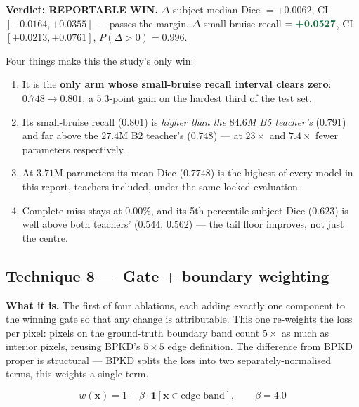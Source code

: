 \documentclass[11pt]{article}
\newcommand{\win}[1]{\textcolor{wingreen}{\textbf{#1}}}
\begin{document}
\textbf{Verdict: \win{REPORTABLE WIN}.}
$\Delta$ subject median Dice $=+0.0062$, CI $[-0.0164,+0.0355]$ --- passes the margin.
$\Delta$ small-bruise recall $=\win{+0.0527}$, CI $[+0.0213,+0.0761]$, $P(\Delta>0)=0.996$.

Four things make this the study's only win:

\begin{enumerate}[leftmargin=1.6em,itemsep=3pt]
  \item It is the \textbf{only arm whose small-bruise recall interval clears zero}:
        $0.748\to0.801$, a $5.3$-point gain on the hardest third of the test set.
  \item Its small-bruise recall ($0.801$) is \emph{higher than the $84.6$M B5 teacher's} ($0.791$)
        and far above the $27.4$M B2 teacher's ($0.748$) --- at $23\times$ and $7.4\times$ fewer
        parameters respectively.
  \item At $3.71$M parameters its mean Dice ($0.7748$) is the highest of every model in this
        report, teachers included, under the same locked evaluation.
  \item Complete-miss stays at $0.00\%$, and its 5th-percentile subject Dice ($0.623$) is well
        above both teachers' ($0.544$, $0.562$) --- the tail floor improves, not just the centre.
\end{enumerate}

\subsection{Technique 8 --- Gate $+$ boundary weighting}

\textbf{What it is.} The first of four ablations, each adding exactly one component to the winning
gate so that any change is attributable. This one re-weights the loss per pixel: pixels on the
ground-truth boundary band count $5\times$ as much as interior pixels, reusing BPKD's $5\times5$
edge definition. The difference from BPKD proper is structural --- BPKD splits the loss into two
separately-normalised terms, this weights a single term.

\[
  w(\mathbf{x}) = 1 + \beta\cdot\mathbf{1}[\mathbf{x}\in\text{edge band}],\qquad \beta=4.0
\]
\end{document}
